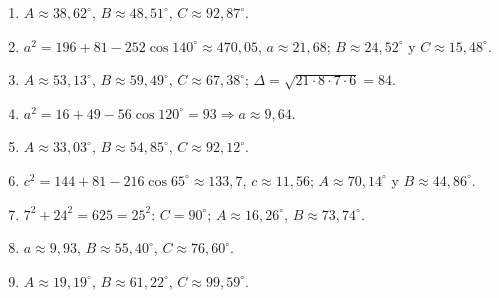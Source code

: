\documentclass[12pt, letterpaper]{article}
\begin{document}
\begin{enumerate}[leftmargin=*, label=\textbf{\arabic*.}, start=26]
  \item $A\approx 38{,}62^\circ$, $B\approx 48{,}51^\circ$, $C\approx 92{,}87^\circ$.
  \item $a^2=196+81-252\cos 140^\circ\approx 470{,}05$, $a\approx 21{,}68$; $B\approx 24{,}52^\circ$ y $C\approx 15{,}48^\circ$.
  \item $A\approx 53{,}13^\circ$, $B\approx 59{,}49^\circ$, $C\approx 67{,}38^\circ$; $\Delta=\sqrt{21\cdot 8\cdot 7\cdot 6}=84$.
  \item $a^2=16+49-56\cos 120^\circ=93\Rightarrow a\approx 9{,}64$.
  \item $A\approx 33{,}03^\circ$, $B\approx 54{,}85^\circ$, $C\approx 92{,}12^\circ$.
  \item $c^2=144+81-216\cos 65^\circ\approx 133{,}7$, $c\approx 11{,}56$; $A\approx 70{,}14^\circ$ y $B\approx 44{,}86^\circ$.
  \item $7^2+24^2=625=25^2$: $C=90^\circ$; $A\approx 16{,}26^\circ$, $B\approx 73{,}74^\circ$.
  \item $a\approx 9{,}93$, $B\approx 55{,}40^\circ$, $C\approx 76{,}60^\circ$.
  \item $A\approx 19{,}19^\circ$, $B\approx 61{,}22^\circ$, $C\approx 99{,}59^\circ$.
\end{enumerate}
\end{document}
